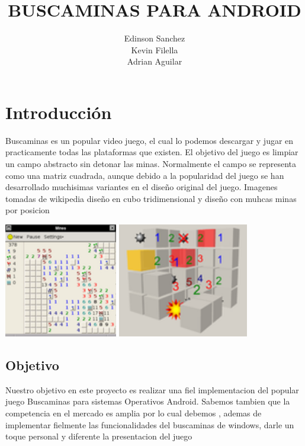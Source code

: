 \documentclass[11pt]{article} %
\title{BUSCAMINAS PARA ANDROID}
\author{Edinson Sanchez\\Kevin Filella\\Adrian Aguilar}
\begin{document}
\maketitle



\newpage
\tableofcontents
\newpage

\section{Introducción}
Buscaminas es un popular video juego, el cual lo podemos descargar y jugar en practicamente todas las plataformas que existen.
El objetivo del juego es limpiar un campo abstracto sin detonar las minas. Normalmente el campo se representa como una matriz cuadrada, aunque debido a la popularidad del juego se han desarrollado
muchisimas variantes en el diseño original del juego.
Imagenes tomadas de wikipedia
diseño en cubo tridimensional y diseño con muhcas minas por posicion

\includegraphics[height=5cm]{imagenes/119px-Firefox_Multiple_mines.png}
\includegraphics[height=5cm]{imagenes/120px-Cube_Minesweeper_3D.png}
\subsection{Objetivo}
Nuestro objetivo en este proyecto es realizar una fiel implementacion del popular juego Buscaminas para sistemas Operativos Android.
Sabemos tambien que la competencia en el mercado es amplia por lo cual debemos , ademas de implementar fielmente las funcionalidades del buscaminas de windows, darle un toque personal y diferente  la presentacion del juego
\end{document}
